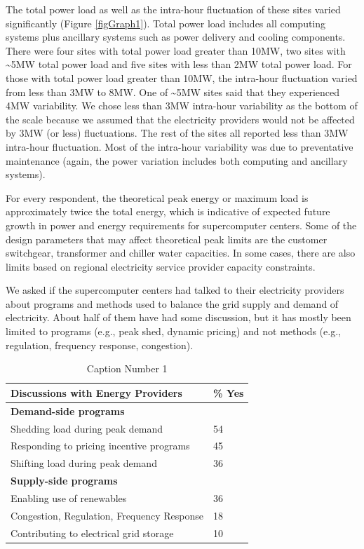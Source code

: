 The total power load as well as the intra-hour fluctuation of these sites
varied significantly (Figure \ref{figGraph1}). Total power load includes all computing systems plus 
ancillary systems such as power delivery and cooling components.
There were four sites with total power load greater
than 10MW, two sites with \textasciitilde 5MW total power load and five
sites with less than 2MW total power load. For those with total power load greater than 10MW, the
intra-hour fluctuation varied from less than 3MW to 8MW. One of
\textasciitilde 5MW sites said that they experienced 4MW variability. We chose less than 3MW intra-hour
variability as the bottom of the scale because we assumed that the
electricity providers would not be affected by 3MW (or less) 
fluctuations. The
rest of the sites all reported less than 3MW intra-hour fluctuation. Most of the intra-hour variability
was due to preventative maintenance (again, the power variation includes both computing and ancillary systems).

For every respondent, the theoretical peak energy or maximum load is approximately twice the total energy, 
which is indicative of expected future growth in power and energy requirements for supercomputer centers.  
Some of the design parameters that may affect theoretical peak limits are the customer switchgear, transformer 
and chiller water capacities.  
In some cases, there are also limits based on regional electricity service provider capacity constraints.

We asked if the supercomputer centers had talked to their electricity
providers about programs and methods used to balance the grid supply and
demand of electricity. About half of them have had some discussion, but it
has mostly been limited to programs (e.g., peak shed, dynamic pricing) 
and not methods (e.g., regulation, frequency response, congestion).

\begin{table}[htbp]
\caption{Caption Number 1}
\begin{tabular}{|p{190pt}|l|}
\hline
\textbf{Discussions with Energy Providers}&
{\%} Yes \\
\hline
\textbf{Demand-side programs}&
~ \\
\hline
Shedding load during peak demand&
54 \\
\hline
Responding to pricing incentive programs&
45 \\
\hline
Shifting load during peak demand&
36 \\
\hline
\textbf{Supply-side programs}&
~ \\
\hline
Enabling use of renewables&
36 \\
\hline
Congestion, Regulation, Frequency Response&
18 \\
\hline
Contributing to electrical grid storage&
10 \\
\hline
\end{tabular}
\label{tab2}
\end{table}

